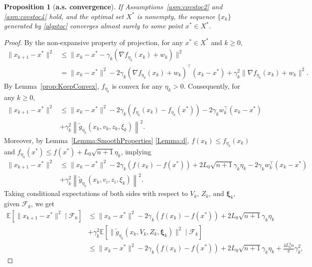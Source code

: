 \documentclass[11pt,reqno]{amsart}
\newcommand{\1}{{\bf 1}}
\newcommand{\2}{{\bf 2}}
\newcommand{\bxi}{\boldsymbol{\xi}}
\numberwithin{equation}{section}
\newtheorem{proposition}{Proposition}[section]
\theoremstyle{remark}
\begin{document}
{		\begin{proposition}[{\bf a.s. convergence}]\label{prop:ascvgstochastic}
			If Assumptions~\ref{asm:covstoc2} and \ref{asm:covstoc4} hold, and the optimal set $X^*$ is nonempty, the sequence $\{x_k\}$ generated by \eqref{algstoc} converges almost surely to some point $x^* \in X^*$.
		\end{proposition}
		\begin{proof}
		By the non-expansive property of projection, for any $x^* \in X^*$ and $k \geq0$,
		\begin{align*}
			\|x_{k+1}-x^*\|^2 &\leq \|x_k-x^*-\gamma_k \left(\nabla f_{\eta_k}(x_k)+w_k\right)\|^2\\
			&=\|x_k-x^*\|^2-2\gamma_k (\nabla f_{\eta_k}(x_k)+w_k)^{\top}(x_k-x^*)+ \gamma_k^2\|\nabla f_{\eta_k}(x_k)+w_k\|^2.
		\end{align*}
		By Lemma~\ref{prop:KeepConvex}, $f_{\eta_k}$ is convex for any $\eta_k >0$. Consequently, for any $k \ge 0$,
		\begin{align*}
			\|x_{k+1}-x^*\|^2 &\leq  \|x_k-x^*\|^2-2\gamma_k \left(f_{\eta_k}(x_k)-f_{\eta_k}(x^*)\right)-2\gamma_k w_k^{\top}(x_k-x^*)\\
			&+ \gamma_k^2\left\| \tilde{g}_{\eta_k}(x_k,v_k,z_k, \xi_k)\right\|^2.
		\end{align*}
		Moreover, by Lemma~\ref{Lemma:SmoothProperties} \eqref{Lemma:d},  $f(x_k) \leq f_{\eta_k}(x_k)$ and $f_{\eta_k}(x^*) \leq f(x^*)+L_0\sqrt{n+1}\eta_k$, implying
		\begin{align}\label{eq:xk-x*}
			\|x_{k+1}-x^*\|^2 &\leq  \|x_k-x^*\|^2-2\gamma_k \left(f(x_k)-f(x^*)\right)+2L_0\sqrt{n+1}\gamma_k\eta_k-2\gamma_k w_k^{\top}(x_k-x^*)\nonumber\\
			& + \gamma_k^2\left\| {\tilde{g}_{\eta_k}}(x_k,v_i,z_i, \xi_k)\right\|^2.
		\end{align}
		Taking conditional expectations of both sides with respect to ${V_k}$, ${Z_k}$, and $\bxi_k$, given $\mathcal{F}_k$, we get
		\begin{align} \label{eq:Exkx*}
			\mathbb{E}[\|x_{k+1}-x^*\|^2 \mid \mathcal{F}_k] &\leq  \|x_k-x^*\|^2-2\gamma_k \left(f(x_k)-f(x^*)\right)+2L_0\sqrt{n+1}\gamma_k\eta_k\nonumber\\
			&+ \gamma_k^2\mathbb{E}[\| {\tilde{g}_{\eta_k}}(x_k,V_k,Z_k, \bxi_k)\|^2 \mid \mathcal{F}_k]\nonumber\\
			&\leq \|x_k-x^*\|^2-2\gamma_k \left(f(x_k)-f(x^*)\right)+2L_0\sqrt{n+1}\gamma_k\eta_k+ \tfrac{4L_0^2n}{ \pi}\gamma_k^2,
		\end{align}

\end{proof}}
\end{document}
